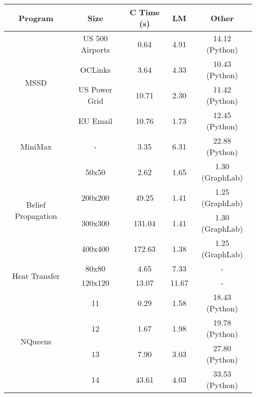 \begin{tabular}{c | c || c | c | c} \hline
	\textbf{Program} & \textbf{Size} & \textbf{C Time} (s) & \textbf{LM} & \textbf{Other} \\ \hline \hline
	\multirow{4}{*}{MSSD}  & US 500 Airports &  0.64  &  4.91  &  14.12 (Python) \\
		 & OCLinks &  3.64  &  4.33  &  10.43 (Python) \\
		 & US Power Grid &  10.71  &  2.30  &  11.42 (Python) \\
		 & EU Email &  10.76  &  1.73  &  12.45 (Python) \\
	\hline
	MiniMax  & - &  3.35  &  6.31  &  22.88 (Python) \\
	\hline
	\multirow{4}{*}{Belief Propagation}  & 50x50 &  2.62  &  1.65  &  1.30 (GraphLab) \\
		 & 200x200 &  49.25  &  1.41  &  1.25 (GraphLab) \\
		 & 300x300 &  131.04  &  1.41  &  1.30 (GraphLab) \\
		 & 400x400 &  172.63  &  1.38  &  1.25 (GraphLab) \\
	\hline
	\multirow{2}{*}{Heat Transfer}  & 80x80 &  4.65  &  7.33  &  - \\
		 & 120x120 &  13.07  &  11.67  &  - \\
	\hline
	\multirow{4}{*}{NQueens}  & 11 &  0.29  &  1.58  &  18.43 (Python) \\
		 & 12 &  1.67  &  1.98  &  19.78 (Python) \\
		 & 13 &  7.90  &  3.03  &  27.80 (Python) \\
		 & 14 &  43.61  &  4.03  &  33.53 (Python) \\
	\hline
\end{tabular}
